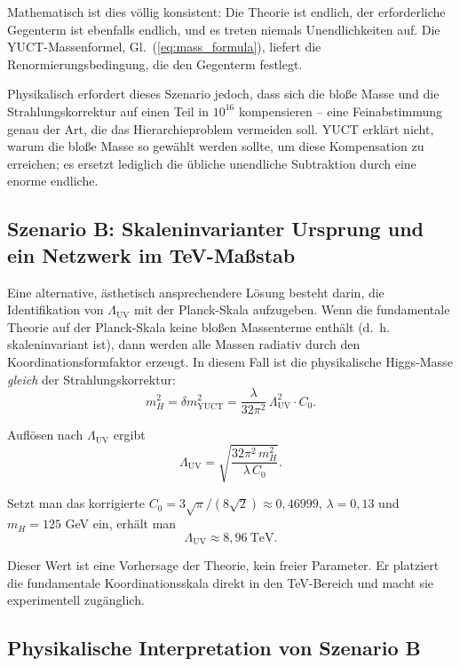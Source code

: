 \documentclass[11pt,a4paper]{article}
\newcommand{\LUV}{\Lambda_{\mathrm{UV}}}
\theoremstyle{remark}
\begin{document}
	Mathematisch ist dies völlig konsistent: Die Theorie ist endlich, der erforderliche Gegenterm ist ebenfalls endlich, und es treten niemals Unendlichkeiten auf. Die YUCT-Massenformel, Gl.~(\ref{eq:mass_formula}), liefert die Renormierungsbedingung, die den Gegenterm festlegt.
	
	Physikalisch erfordert dieses Szenario jedoch, dass sich die bloße Masse und die Strahlungskorrektur auf einen Teil in \(10^{16}\) kompensieren – eine Feinabstimmung genau der Art, die das Hierarchieproblem vermeiden soll. YUCT erklärt nicht, warum die bloße Masse so gewählt werden sollte, um diese Kompensation zu erreichen; es ersetzt lediglich die übliche unendliche Subtraktion durch eine enorme endliche.
	
	\subsection{Szenario B: Skaleninvarianter Ursprung und ein Netzwerk im TeV-Maßstab}
	
	Eine alternative, ästhetisch ansprechendere Lösung besteht darin, die Identifikation von \(\LUV\) mit der Planck-Skala aufzugeben. Wenn die fundamentale Theorie auf der Planck-Skala keine bloßen Massenterme enthält (d.~h. skaleninvariant ist), dann werden alle Massen radiativ durch den Koordinationsformfaktor erzeugt. In diesem Fall ist die physikalische Higgs-Masse \emph{gleich} der Strahlungskorrektur:
	\begin{equation}
		m_H^2 = \delta m^2_{\mathrm{YUCT}} = \frac{\lambda}{32\pi^2}\,\LUV^2 \cdot C_0.
		\label{eq:scale_inv}
	\end{equation}
	
	Auflösen nach \(\LUV\) ergibt
	\begin{equation}
		\LUV = \sqrt{\frac{32\pi^2\, m_H^2}{\lambda\, C_0}}.
		\label{eq:LUV_solve}
	\end{equation}
	
	Setzt man das korrigierte \(C_0 = 3\sqrt{\pi}/(8\sqrt{2}) \approx 0,46999\), \(\lambda = 0,13\) und \(m_H = 125\) GeV ein, erhält man
	\begin{equation}
		\boxed{\LUV \approx 8,96\ \mathrm{TeV}}.
		\label{eq:LUV_TeV}
	\end{equation}
	
	Dieser Wert ist eine Vorhersage der Theorie, kein freier Parameter. Er platziert die fundamentale Koordinationsskala direkt in den TeV-Bereich und macht sie experimentell zugänglich.
	
	\subsection{Physikalische Interpretation von Szenario B}
	
\end{document}
